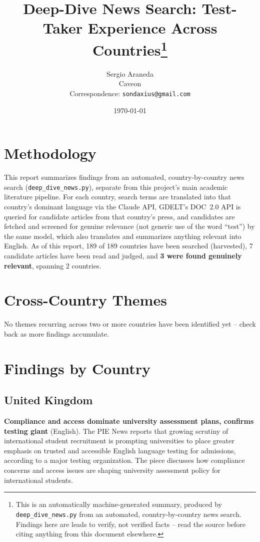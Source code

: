 \documentclass[11pt]{article}
\title{Deep-Dive News Search: Test-Taker Experience Across Countries\thanks{This is an automatically machine-generated summary, produced by \texttt{deep\_dive\_news.py} from an automated, country-by-country news search. Findings here are leads to verify, not verified facts -- read the source before citing anything from this document elsewhere.}}
\author{Sergio Araneda \\ Caveon \\ Correspondence: \texttt{sondaxius@gmail.com}}
\date{\today}
\begin{document}
\maketitle

\section{Methodology}

This report summarizes findings from an automated, country-by-country news search (\texttt{deep\_dive\_news.py}), separate from this project's main academic literature pipeline. For each country, search terms are translated into that country's dominant language via the Claude API, GDELT's DOC~2.0 API is queried for candidate articles from that country's press, and candidates are fetched and screened for genuine relevance (not generic use of the word ``test'') by the same model, which also translates and summarizes anything relevant into English. As of this report, 189 of 189 countries have been searched (harvested), 7 candidate articles have been read and judged, and \textbf{3 were found genuinely relevant}, spanning 2 countries.

\section{Cross-Country Themes}

No themes recurring across two or more countries have been identified yet -- check back as more findings accumulate.

\section{Findings by Country}

\subsection{United Kingdom}

\textbf{Compliance and access dominate university assessment plans, confirms testing giant} \citep{thepienewscom2026n0} (English). The PIE News reports that growing scrutiny of international student recruitment is prompting universities to place greater emphasis on trusted and accessible English language testing for admissions, according to a major testing organization. The piece discusses how compliance concerns and access issues are shaping university assessment policy for international students.
\end{document}
